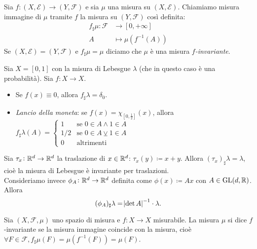 \begin{definition}
	Sia $ f\colon (X,\mathcal{E}) \to (Y,\mathcal{F}) $ e sia $ \mu $ una misura su $ (X,\mathcal{E}) $. Chiamiamo misura immagine di $ \mu $ tramite $ f $ la misura su $ (Y, \mathcal{F}) $ così definita:
	\begin{align*}
		f_\sharp \mu\colon \mathcal{F} & \to [0,+\infty]                      \\
		A                              & \mapsto \mu \left( f^{-1}(A) \right)
	\end{align*}
	Se $ (X,\mathcal{E}) = (Y,\mathcal{F}) $ e $ f_\sharp\mu = \mu $ diciamo che $ \mu $ è una misura \emph{$ f $-invariante}.
\end{definition}

\begin{example}
	Sia $ X = [0,1] $ con la misura di Lebesgue $ \lambda $ (che in questo caso è una probabilità). Sia $ f\colon X\to X $.
	\begin{itemize}
		\item Se $ f(x) \equiv 0 $, allora $ f_\sharp \lambda = \delta_0 $.
		\item \emph{Lancio della moneta}: se $ f(x) = \chi_{[0,\frac{1}{2}]}(x) $, allora $ f_\sharp \lambda (A) =
		\begin{cases}
			1	& \text{se } 0\in A \wedge 1 \in A \\
			1/2 & \text{se } 0\in A \veebar 1\in A \\
			0			& \text{altrimenti}
		\end{cases} $
	\end{itemize}
\end{example}

\begin{example}
	Sia $ \tau_x\colon \mathbb{R}^d\to\mathbb{R}^d $ la traslazione di $ x\in\mathbb{R}^d $: $ \tau_x(y) \coloneqq x+y $. Allora $ (\tau_x)_\sharp\lambda = \lambda $, cioè la misura di Lebesgue è invariante per traslazioni. \\
    Consideriamo invece $ \phi_A\colon\mathbb{R}^d\to\mathbb{R}^d $ definita come $ \phi(x) \coloneqq Ax $ con $ A \in\mathrm{GL}(d,\mathbb{R}) $. Allora 
    \[
        (\phi_A)_\sharp\lambda = \abs{\det A}^{-1} \cdot \lambda.
    \] 
\end{example}

\begin{definition}
    Sia $ (X, \mathcal{F}, \mu) $ uno spazio di misura e $ f \colon X \to X $ misurabile. La misura $ \mu $ si dice $ f $-invariante se la misura immagine coincide con la misura, cioè $ \forall F \in \mathcal{F}, f_\sharp \mu(F) = \mu(f^{-1}(F)) = \mu(F) $. 
\end{definition}


